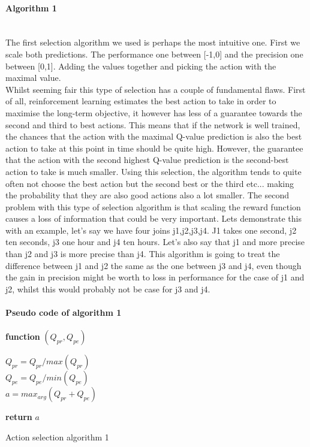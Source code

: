 \paragraph{Algorithm 1}\mbox{}\\
The first selection algorithm we used is perhaps the most intuitive one. First we scale both predictions. The performance one between [-1,0] and the precision one between [0,1]. Adding the values together and picking the action with the maximal value.\\
Whilst seeming fair this type of selection has a couple of fundamental flaws. First of all, reinforcement learning estimates the best action to take in order to maximise the long-term objective, it however has less of a guarantee towards the second and third to best actions. This means that if the network is well trained, the chances that the action with the maximal Q-value prediction is also the best action to take at this point in time should be quite high. However, the guarantee that the action with the second highest Q-value prediction is the second-best action to take is much smaller. Using this selection, the algorithm tends to quite often not choose the best action but the second best or the third etc... making the probability that they are also good actions also a lot smaller. The second problem with this type of selection algorithm is that scaling the reward function causes a loss of information that could be very important. Lets demonstrate this with an example, let's say we have four joins j1,j2,j3,j4. J1 takes one second, j2 ten seconds, j3 one hour and j4 ten hours. Let's also say that j1 and more precise than j2 and j3 is more precise than j4. This algorithm is going to treat the difference between j1 and j2 the same as the one between j3 and j4, even though the gain in precision might be worth to loss in performance for the case of j1 and j2, whilst this would probably not be case for j3 and j4.
\paragraph{Pseudo code of algorithm 1}
\begin{center}
\begin{algorithm}[H]

    \textbf{function}  $(Q_{pr},Q_{pe})$\;
    
    
    \Indp{}\Indm
    \Indp{} \Indm
    \Indp
    $Q_{pr} = Q_{pr}/max(Q_{pr})$\\
    $Q_{pe} = Q_{pe}/min(Q_{pe})$\\
    $a = max_{arg}(Q_{pr}+Q_{pe})$
    
  
   \textbf{return} $a$

\caption{Action selection algorithm 1}
\end{algorithm}
\end{center}
